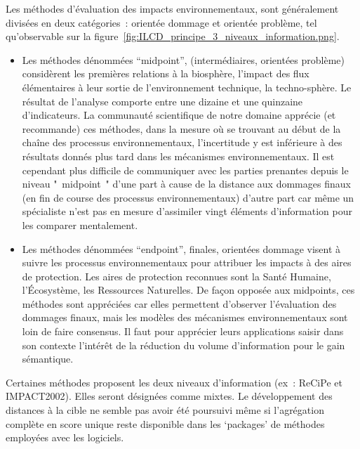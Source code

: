   Les méthodes d'évaluation des impacts environnementaux, sont généralement divisées en deux catégories~: orientée dommage et orientée problème, tel qu'observable sur la figure~\ref{fig:ILCD_principe_3_niveaux_information.png}.
  \begin{itemize}
   \item   Les méthodes dénommées ``midpoint'', (intermédiaires, orientées problème) considèrent les premières relations à la biosphère, l'impact des flux élémentaires à leur sortie de l'environnement technique, la techno-sphère.
  Le résultat de l'analyse comporte entre une dizaine et une quinzaine d'indicateurs.
  La communauté scientifique de notre domaine apprécie (et recommande) ces méthodes, dans la mesure où se trouvant au début de la chaîne des processus environnementaux, l'incertitude y est inférieure à des résultats donnés plus tard dans les mécanismes environnementaux.
  Il est cependant plus difficile de communiquer avec les parties prenantes  depuis le niveau "~midpoint~" d'une part à cause de la distance aux dommages finaux (en fin de course des processus environnementaux) d'autre part car même un spécialiste n'est pas en mesure d'assimiler vingt éléments d'information pour les comparer mentalement.

  \item Les méthodes dénommées ``endpoint'', finales, orientées dommage visent à suivre les processus environnementaux pour attribuer les impacts à des aires de protection.
  Les aires de protection reconnues sont la Santé Humaine, l'Écosystème, les Ressources Naturelles.
  De façon opposée aux midpoints, ces méthodes sont appréciées car elles permettent d'observer l'évaluation des dommages finaux, mais les modèles des mécanismes environnementaux sont loin de faire consensus.
  Il faut pour apprécier leurs applications saisir dans son contexte l'intérêt de la réduction du volume d'information pour le gain sémantique.
  \end{itemize}
  Certaines méthodes proposent les deux niveaux d'information (ex~: ReCiPe\cite{goedkoop_recipe_2013} et IMPACT2002\cite{jolliet_impact_2003}).
  Elles seront désignées comme mixtes.
  Le développement des distances à la cible ne semble pas avoir été poursuivi même si l'agrégation complète en score unique reste disponible dans les `packages' de méthodes employées avec les logiciels.
  
